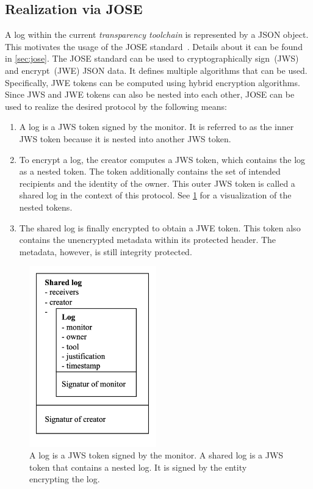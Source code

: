 \documentclass[../main.tex]{subfiles}
\begin{document}
\subsection{Realization via JOSE}
\label{sec:jose-protocol}

A log within the current \emph{transparency toolchain} is represented by a JSON object.
This motivates the usage of the JOSE standard~\cite{Barnes2014}.
Details about it can be found in \cref{sec:jose}.
The JOSE standard can be used to cryptographically sign~(JWS) and encrypt~(JWE) JSON data.
It defines multiple algorithms that can be used.
Specifically, JWE tokens can be computed using hybrid encryption algorithms.
Since JWS and JWE tokens can also be nested into each other, JOSE can be used to realize the desired protocol by the following means:
\begin{enumerate}
    \item 
    A log is a JWS token signed by the monitor.
    It is referred to as the inner JWS token because it is nested into another JWS token.
    \item 
    To encrypt a log, the creator computes a JWS token, which contains the log as a nested token.
    The token additionally contains the set of intended recipients and the identity of the owner.
    This outer JWS token is called a shared log in the context of this protocol.
    See \cref{fig:nested-jws} for a visualization of the nested tokens.
    \item
    The shared log is finally encrypted to obtain a JWE token.
    This token also contains the unencrypted metadata within its protected header.
    The metadata, however, is still integrity protected.
\end{enumerate}


\begin{figure}[h!]
    \includegraphics[width=5.5cm]{../img/05/nested_jws.png}
    \centering
    \caption[Nested JWS tokens]{A log is a JWS token signed by the monitor. A shared log is a JWS token that contains a nested log. It is signed by the entity encrypting the log.}
    \label{fig:nested-jws}
\end{figure}
\end{document}
